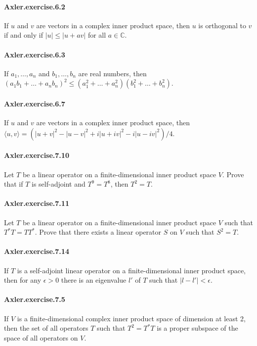 \documentclass{article}
\begin{document}
\paragraph{Axler.exercise.6.2} If $u$ and $v$ are vectors in a complex inner product space, then $u$ is orthogonal to $v$ if and only if $|u|\leq |u+av|$ for all $a\in\mathbb{C}$.

\paragraph{Axler.exercise.6.3} If $a_1, \dots, a_n$ and $b_1, \dots, b_n$ are real numbers, then $(a_1b_1 + \dots + a_nb_n)^2 \leq (a_1^2 + \dots + a_n^2)(b_1^2 + \dots + b_n^2)$.

\paragraph{Axler.exercise.6.7} If $u$ and $v$ are vectors in a complex inner product space, then $\langle u, v\rangle = (|u+v|^2 - |u-v|^2 + i|u+iv|^2 - i|u-iv|^2)/4$.

\paragraph{Axler.exercise.7.10} Let $T$ be a linear operator on a finite-dimensional inner product space $V$. Prove that if $T$ is self-adjoint and $T^9=T^8$, then $T^2=T$.

\paragraph{Axler.exercise.7.11} Let $T$ be a linear operator on a finite-dimensional inner product space $V$ such that $T^*T=TT^*$. Prove that there exists a linear operator $S$ on $V$ such that $S^2=T$.

\paragraph{Axler.exercise.7.14} If $T$ is a self-adjoint linear operator on a finite-dimensional inner product space, then for any $\epsilon>0$ there is an eigenvalue $l'$ of $T$ such that $|l-l'|<\epsilon$.

\paragraph{Axler.exercise.7.5} If $V$ is a finite-dimensional complex inner product space of dimension at least 2, then the set of all operators $T$ such that $T^2=T^*T$ is a proper subspace of the space of all operators on $V$.
\end{document}

